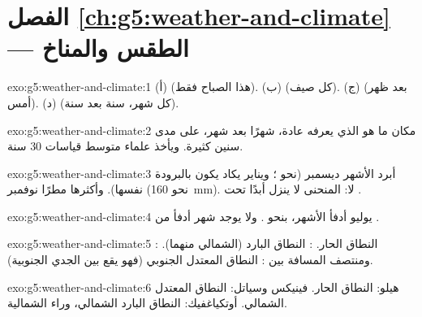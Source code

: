 \section*{الفصل \ref{ch:g5:weather-and-climate} --- الطقس والمناخ}

\begin{solution}{exo:g5:weather-and-climate:1}
(أ)  (هذا الصباح فقط). (ب)  (كل صيف). (ج) 
(بعد ظهر أمس). (د)  (كل شهر، سنة بعد سنة).
\end{solution}

\begin{solution}{exo:g5:weather-and-climate:2}
 مكان ما هو  الذي يعرفه عادة، شهرًا بعد شهر، على مدى
سنين كثيرة. ويأخذ علماء  متوسط قياسات 30 سنة.
\end{solution}

\begin{solution}{exo:g5:weather-and-climate:3}
أبرد الأشهر ديسمبر (نحو ؛ ويناير يكاد يكون بالبرودة
نفسها). وأكثرها مطرًا نوفمبر (نحو 160~mm). لا: المنحنى لا ينزل أبدًا
تحت .
\end{solution}

\begin{solution}{exo:g5:weather-and-climate:4}
يوليو أدفأ الأشهر، بنحو . ولا يوجد شهر أدفأ من
.
\end{solution}

\begin{solution}{exo:g5:weather-and-climate:5}
: النطاق الحار. : النطاق البارد (الشمالي
منهما). ومنتصف المسافة بين  : النطاق
المعتدل الجنوبي (فهو يقع بين  الجدي 
الجنوبية).
\end{solution}

\begin{solution}{exo:g5:weather-and-climate:6}
هيلو: النطاق الحار. فينيكس وسياتل: النطاق المعتدل الشمالي.
أوتكياغفيك: النطاق البارد الشمالي، وراء  الشمالية.
\end{solution}

